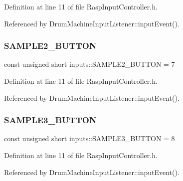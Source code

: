 Definition at line 11 of file Rasp\+Input\+Controller.\+h.



Referenced by Drum\+Machine\+Input\+Listener\+::input\+Event().

\mbox{\label{namespaceinputs_afcf2086c7f58f801e5654d8e573d928c}} 
\subsubsection{\texorpdfstring{S\+A\+M\+P\+L\+E2\+\_\+\+B\+U\+T\+T\+ON}{SAMPLE2\_BUTTON}}
{\footnotesize\ttfamily const unsigned short inputs\+::\+S\+A\+M\+P\+L\+E2\+\_\+\+B\+U\+T\+T\+ON = 7}



Definition at line 11 of file Rasp\+Input\+Controller.\+h.



Referenced by Drum\+Machine\+Input\+Listener\+::input\+Event().

\mbox{\label{namespaceinputs_a17158d35ca30fb91c6f9f757ce0d7ccc}} 
\subsubsection{\texorpdfstring{S\+A\+M\+P\+L\+E3\+\_\+\+B\+U\+T\+T\+ON}{SAMPLE3\_BUTTON}}
{\footnotesize\ttfamily const unsigned short inputs\+::\+S\+A\+M\+P\+L\+E3\+\_\+\+B\+U\+T\+T\+ON = 8}



Definition at line 11 of file Rasp\+Input\+Controller.\+h.



Referenced by Drum\+Machine\+Input\+Listener\+::input\+Event().

\mbox{\label{namespaceinputs_ac9ccac580f0955e454a367ddc6421d78}} 
